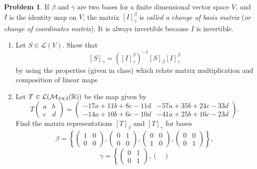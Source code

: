 \documentclass[10pt]{article}
\theoremstyle{definition}
\newtheorem{problem}{Problem}
\begin{document}
\begin{problem}
If $\beta$ and $\gamma$ are two bases for a finite dimensional vector space $V$,
and $I$ is the identity map on $V$, the matrix $\left[I\right]_\gamma^\beta$ is \emph{called a change of basis matrix}
(\emph{or change of coordinates matrix}). It is always invertible because $I$ is invertible.
\begin{enumerate}
  \item Let $S\in \mathcal{L}(V)$. Show that
        $$\left[S\right]_\gamma=\left(\left[I\right]_\gamma^\beta\right)^{-1}\left[S\right]_\beta\left[I\right]_\gamma^\beta$$
        by using the properties (given in class) which relate matrix multiplication and composition of linear maps
  \item Let $T\in\mathcal{L}(\mathcal{M}_{2\cross 2}(\mathbb{R}))$ be the map given by
        $$T\begin{pmatrix}
            a & b \\
            c & d
          \end{pmatrix}=
          \begin{pmatrix}
            -17a+11b+8c-11d & -57a+35b+24c-33d \\
            -14a+10b+6c-10d & -41a+25b+16c-23d
          \end{pmatrix}.$$
        Find the matrix representations $\left[T\right]_\beta$ and $\left[T\right]_\gamma$ for bases
        $$\beta=\left\{\begin{pmatrix}
            1 & 0 \\
            0 & 0
          \end{pmatrix},
          \begin{pmatrix}
            0 & 1 \\
            0 & 0
          \end{pmatrix},
          \begin{pmatrix}
            0 & 0 \\
            1 & 0
          \end{pmatrix},
          \begin{pmatrix}
            0 & 0 \\
            0 & 1
          \end{pmatrix}\right\},$$
        $$\gamma=
          \left\{\begin{pmatrix}
            0 & 1 \\
            0 & 1
          \end{pmatrix},
          \begin{pmatrix}

\end{pmatrix}$$
\end{enumerate}
\end{problem}
\end{document}
